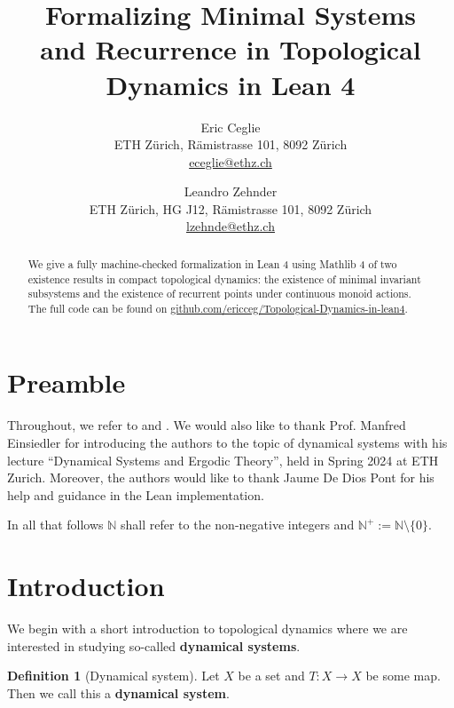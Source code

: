 \documentclass[11pt]{article}
\title{{\huge\bfseries Formalizing Minimal Systems \\ and Recurrence in Topological Dynamics in Lean 4}}
\author{%
  Eric Ceglie\\
  ETH Zürich, Rämistrasse 101, 8092 Zürich\\
  \href{mailto:eceglie@student.ethz.ch}{eceglie@ethz.ch}
  \and
  Leandro Zehnder\\
  ETH Zürich, HG J12, Rämistrasse 101, 8092 Zürich\\
  \href{mailto:lzehnde@student.ethz.ch}{lzehnde@ethz.ch}
}
\theoremstyle{definition}              %
\newtheorem{definition}{Definition}[section]
\theoremstyle{definition}              %
\theoremstyle{definition}              %
\begin{document}
\maketitle


\pagebreak
\begin{abstract}
We give a fully machine-checked formalization in Lean 4 using Mathlib 4 of two existence results in compact topological dynamics: the existence of minimal invariant subsystems and the existence of recurrent points under continuous monoid actions. The full code can be found on \href{https://github.com/ericceg/Topological-Dynamics-in-lean4}{github.com/ericceg/Topological-Dynamics-in-lean4}.
\end{abstract}




\pagebreak
\tableofcontents

\pagebreak

\newpage
{}

\section*{Preamble}
Throughout, we refer to \cite[Section 2]{brin2002introduction} and \cite[Exercises 4.2.1 and 4.2.2]{einsiedler2010ergodic}.
We would also like to thank Prof. Manfred Einsiedler for introducing the authors to the topic of dynamical systems with his lecture “Dynamical Systems and Ergodic Theory”, held in Spring 2024 at ETH Zurich. Moreover, the authors would like to thank Jaume De Dios Pont for his help and guidance in the Lean implementation. 
\newpage


In all that follows $\mathbb{N}$ shall refer to the non-negative integers and $\mathbb{N}^+:=\mathbb{N} \setminus \{0\}$.

\section{Introduction}\label{chap1}
We begin with a short introduction to topological dynamics where we are interested in studying so-called \textbf{dynamical systems}.

\begin{definition}[Dynamical system]
    Let $X$ be a set and $T: X \to X$ be some map. Then we call this a \textbf{dynamical system}.
\end{definition}
\end{document}
